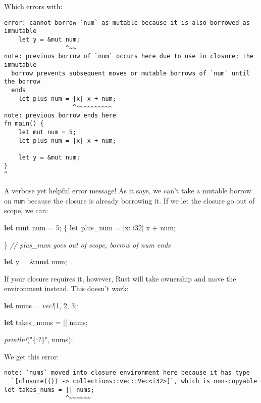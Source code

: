 \documentclass[a4paper,]{book}
\newenvironment{Shaded}{\begin{snugshade}}{\end{snugshade}}
\newcommand{\KeywordTok}[1]{\textcolor[rgb]{0.13,0.29,0.53}{\textbf{{#1}}}}
\newcommand{\DataTypeTok}[1]{\textcolor[rgb]{0.13,0.29,0.53}{{#1}}}
\newcommand{\DecValTok}[1]{\textcolor[rgb]{0.00,0.00,0.81}{{#1}}}
\newcommand{\StringTok}[1]{\textcolor[rgb]{0.31,0.60,0.02}{{#1}}}
\newcommand{\CommentTok}[1]{\textcolor[rgb]{0.56,0.35,0.01}{\textit{{#1}}}}
\newcommand{\PreprocessorTok}[1]{\textcolor[rgb]{0.56,0.35,0.01}{\textit{{#1}}}}
\newcommand{\NormalTok}[1]{{#1}}
\begin{document}
Which errors with:

\begin{verbatim}
error: cannot borrow `num` as mutable because it is also borrowed as immutable
    let y = &mut num;
                 ^~~
note: previous borrow of `num` occurs here due to use in closure; the immutable
  borrow prevents subsequent moves or mutable borrows of `num` until the borrow
  ends
    let plus_num = |x| x + num;
                   ^~~~~~~~~~~
note: previous borrow ends here
fn main() {
    let mut num = 5;
    let plus_num = |x| x + num;

    let y = &mut num;
}
^
\end{verbatim}

A verbose yet helpful error message! As it says, we can't take a mutable
borrow on \texttt{num} because the closure is already borrowing it. If
we let the closure go out of scope, we can:

\begin{Shaded}
\begin{Highlighting}[]
\KeywordTok{let} \KeywordTok{mut} \NormalTok{num = }\DecValTok{5}\NormalTok{;}
\NormalTok{\{}
    \KeywordTok{let} \NormalTok{plus_num = |x: }\DataTypeTok{i32}\NormalTok{| x + num;}

\NormalTok{\} }\CommentTok{// plus_num goes out of scope, borrow of num ends}

\KeywordTok{let} \NormalTok{y = &}\KeywordTok{mut} \NormalTok{num;}
\end{Highlighting}
\end{Shaded}

If your closure requires it, however, Rust will take ownership and move
the environment instead. This doesn't work:

\begin{Shaded}
\begin{Highlighting}[]
\KeywordTok{let} \NormalTok{nums = }\PreprocessorTok{vec!}\NormalTok{[}\DecValTok{1}\NormalTok{, }\DecValTok{2}\NormalTok{, }\DecValTok{3}\NormalTok{];}

\KeywordTok{let} \NormalTok{takes_nums = || nums;}

\PreprocessorTok{println!}\NormalTok{(}\StringTok{"\{:?\}"}\NormalTok{, nums);}
\end{Highlighting}
\end{Shaded}

We get this error:

\begin{verbatim}
note: `nums` moved into closure environment here because it has type
  `[closure(()) -> collections::vec::Vec<i32>]`, which is non-copyable
let takes_nums = || nums;
                 ^~~~~~~
\end{verbatim}
\end{document}
